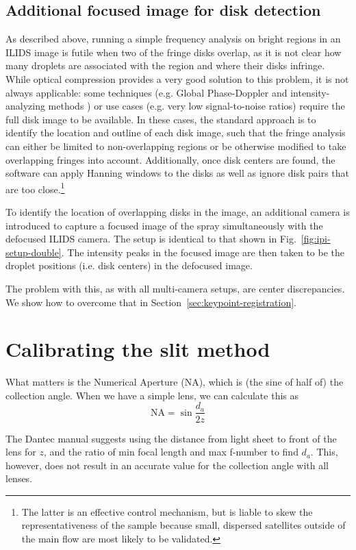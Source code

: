 \documentclass[11.5pt]{book}
\newcommand*{\figref}[1]{Fig.~\ref{#1}}
\newcommand*{\secref}[1]{Section~\ref{#1}}
\begin{document}
\subsection{Additional focused image for disk detection}
As described above, running a simple frequency analysis on bright regions in an
ILIDS image is futile when two of the fringe disks overlap, as it is not clear
how many droplets are associated with the region and where their disks infringe.
While optical compression provides a very good solution to this problem, it is
not always applicable: some techniques (e.g. Global
Phase-Doppler \cite{Damaschke01} and intensity-analyzing methods \cite{Querel10})
or use cases (e.g. very low signal-to-noise ratios) require the full disk image
to be available. In these cases, the standard approach is to identify the
location and outline of each disk image, such that the fringe analysis can
either be limited to non-overlapping regions or be otherwise modified to take
overlapping fringes into account. Additionally, once disk centers are found, the
software can apply Hanning windows to the disks as well as ignore disk pairs
that are too close.\footnote{The latter is an effective control mechanism, but
    is liable to skew the representativeness of the sample because small,
dispersed satellites outside of the main flow are most likely to be validated.}

To identify the location of overlapping disks in the image, an additional camera
is introduced to capture a focused image of the spray simultaneously with the
defocused ILIDS camera. The setup is identical to that shown in
\figref{fig:ipi-setup-double}. The intensity peaks in the focused image are then taken
to be the droplet positions (i.e. disk centers) in the defocused image.

The problem with this, as with all multi-camera setups, are center
discrepancies. We show how to overcome that in
\secref{sec:keypoint-registration}.

\section{Calibrating the slit method}
What matters is the Numerical Aperture (NA), which is (the sine of half of) the
collection angle. When we have a simple lens, we can calculate this as
\begin{equation}
    \mathrm{NA} = \sin \frac{d_a}{2z}
\end{equation}

The Dantec manual suggests using the distance from light sheet to front of the
lens for $z$, and the ratio of min focal length and max f-number to find $d_a$.
This, however, does not result in an accurate value for the collection angle
with all lenses.
\end{document}
